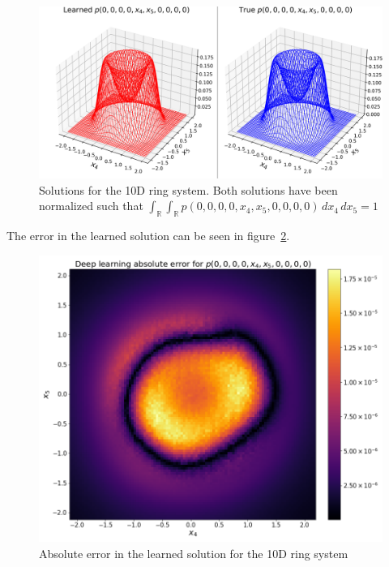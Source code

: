 \begin{figure}[!ht]
    \centering\includegraphics[scale=0.6
]{steady-fp/plots/steady-plots-10D-surface.png}
\caption{Solutions for the 10D ring system. Both solutions have been normalized such that $\int_{\mathbb R}\int_{\mathbb R}p(0, 0, 0, 0, x_4, x_5, 0, 0, 0, 0)\,dx_4\,dx_5=1$} 
    \label{fig:10D-surface--steady-fp}
\end{figure}
The error in the learned solution can be seen in figure~\ref{fig:10D-error--steady-fp}.

\begin{figure}[!ht]
    \centering
\includegraphics[scale=0.32]{steady-fp/plots/steady-plots-10D-error.png}
\caption{Absolute error in the learned solution for the 10D ring system}
    \label{fig:10D-error--steady-fp}
\end{figure}

    

